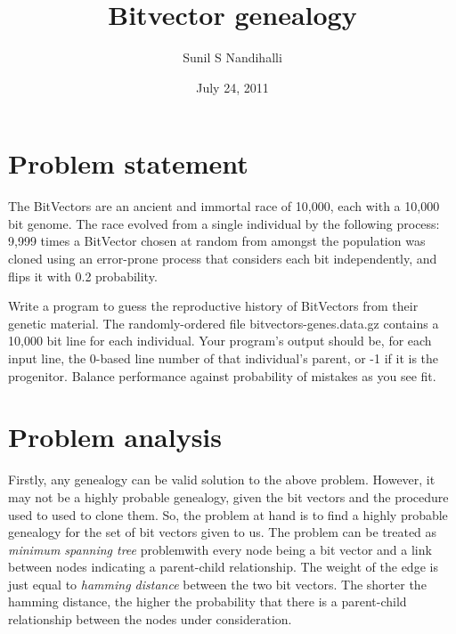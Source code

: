 \documentclass[12pt]{article}
\title{Bitvector genealogy}			%
\author{Sunil S Nandihalli }		%
\date{July 24, 2011}					%
\begin{document}
\maketitle						%

\section{Problem statement}

The BitVectors are an ancient and immortal race of 10,000, each with a 10,000 bit genome. The race evolved from a single individual by the following process: 9,999 times a BitVector chosen at random from amongst the population was cloned using an error-prone process that considers each bit independently, and flips it with 0.2 probability.

Write a program to guess the reproductive history of BitVectors from their genetic material. The randomly-ordered file bitvectors-genes.data.gz contains a 10,000 bit line for each individual. Your program's output should be, for each input line, the 0-based line number of that individual's parent, or -1 if it is the progenitor. Balance performance against probability of mistakes as you see fit.

\section{Problem analysis}

Firstly, any genealogy can be valid solution to the above problem. However, it may not be a highly probable genealogy, given the bit vectors and the procedure used to used to clone them. So, the problem at hand is to find a highly probable genealogy for the set of bit vectors given to us. The problem can be treated as \emph{minimum spanning tree} problemwith every node being a bit vector and a link between nodes indicating a parent-child relationship. The weight of the edge is just equal to \emph{hamming distance} between the two bit vectors. The shorter the hamming distance, the higher the probability that there is a parent-child relationship between the nodes under consideration.
\end{document}
